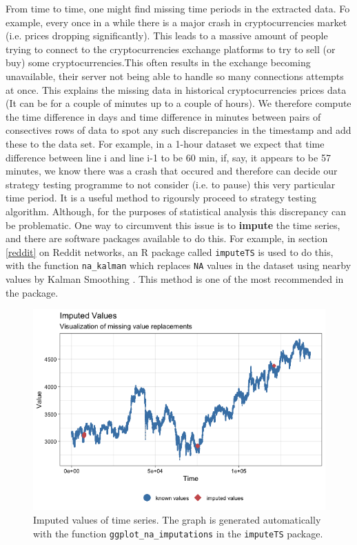 \documentclass[twoside]{report}
\newcommand{\code}{\texttt}
\begin{document}
\begin{spacing}{1}
From time to time, one might find missing time periods in the extracted data. Fo example, every once in a while there is a major crash in cryptocurrencies market (i.e. prices dropping significantly). This leads to a massive amount of people trying to connect to the cryptocurrencies exchange platforms to try to sell (or buy) some cryptocurrencies.This often results in the exchange becoming unavailable, their server not being able to handle so many connections attempts at once. This explains the missing data in historical cryptocurrencies prices data (It can be for a couple of minutes up to a couple of hours). We therefore compute the time difference in days and time difference in minutes between pairs of consectives rows of data to spot any such discrepancies in the timestamp and add these to the data set. For example, in a 1-hour dataset we expect that time difference between line i and line i-1 to be 60 min, if, say, it appears to be 57 minutes, we know there was a crash that occured and therefore can decide our strategy testing programme to not consider (i.e. to pause) this very particular time period. It is a useful method to rigoursly proceed to strategy testing algorithm. 
Although, for the purposes of statistical analysis this discrepancy can be problematic. One way to circumvent this issue is to \textbf{impute} the time series, and there are software packages available to do this. For example, in section \ref{reddit} on Reddit networks, an R package called \code{imputeTS} is used to do this, with the function \code{na\_kalman} which replaces \code{NA} values in the dataset using nearby values by Kalman Smoothing \cite{KalmanFilter}. This method is one of the most recommended in the package.

\begin{figure}[H]
    \centering
    \includegraphics[width=\linewidth]{Reddit_Analysis/Price_Data_Extraction/Data/Binance_OHLC/imputed_gg_1m.png}
    \caption{Imputed values of time series. The graph is generated automatically with the function \code{ggplot\_na\_imputations} in the \code{imputeTS} package.}
    \label{fig:imputations}
\end{figure}



\end{spacing}
\end{document}
